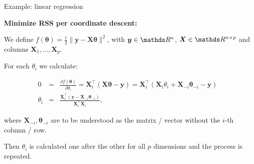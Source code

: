 \documentclass[11pt,compress,t,notes=noshow, xcolor=table]{beamer}
\begin{document}
\begin{vbframe}{Example: linear regression}

\textbf{Minimize RSS per coordinate descent:}

We define $f(\bm{\theta}) = \frac{1}{2} \|\bm{y} - \bm{X}\bm{\theta}\|^2$,
with $\bm{y} \in \R^n$, $\bm{X} \in \R^{n \times p}$ and columns $\bm{X}_1, \hdots, \bm{X}_p$.

\lz

For each  $\theta_i$ we calculate:

\begin{footnotesize}
\begin{eqnarray*}
  0 &=& \frac{\partial{f}(\bm{\theta})}{\partial \theta_i}  = \bm{X}_i^{\top} (\bm{X\theta} - \bm{y}) = \bm{X}_i^{\top} (\bm{X}_i \theta_i + \bm{X}_{-i} \bm{\theta}_{-i} - \bm{y}) \\
\theta_i &=& \frac{\bm{X}_i^\top (\bm{y} - \bm{X}_{-i} \bm{\theta}_{-i})}{\bm{X}_i^{\top} \bm{X}_i},
\end{eqnarray*}
\end{footnotesize}

where $\bm{X}_{-i}, \bm{\theta}_{-i}$ are to be understood as the matrix / vector without the $i$-th column / row.

\vspace*{0.2cm}

Then $\theta_i$ is calculated one after the other for all $p$ dimensions and the process is repeated.


\end{vbframe}
\end{document}
